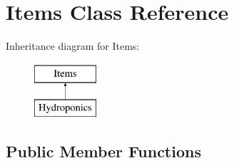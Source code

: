 \hypertarget{class_items}{}\section{Items Class Reference}
\label{class_items}
Inheritance diagram for Items\+:\begin{figure}[H]
\begin{center}
\leavevmode
\includegraphics[height=2.000000cm]{class_items}
\end{center}
\end{figure}
\subsection*{Public Member Functions}
